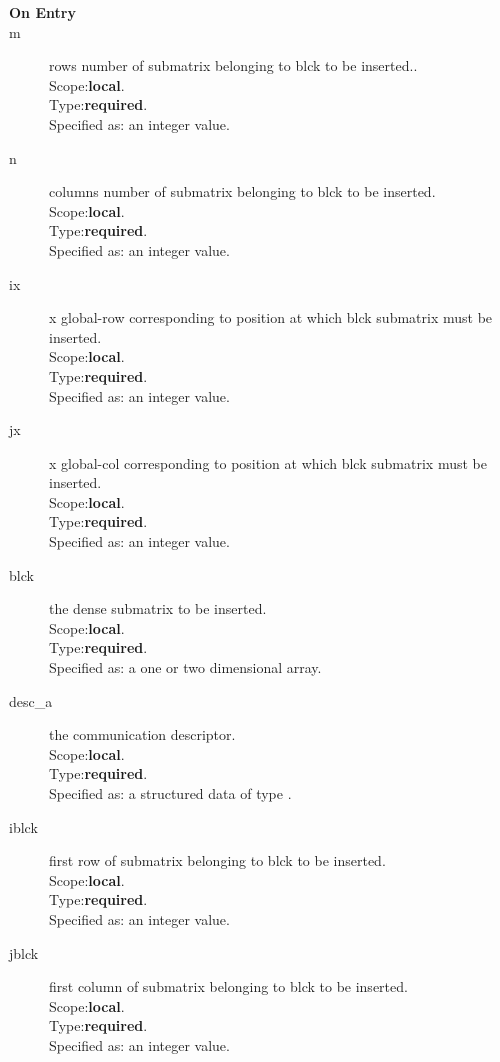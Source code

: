 \begin{description}
\item[\bf On Entry]
\item[m] rows number of submatrix belonging to blck to be inserted..\\
Scope:{\bf local}.\\
Type:{\bf required}.\\
Specified as: an integer value.
\item[n] columns number of submatrix belonging to blck to be inserted.\\
Scope:{\bf local}.\\
Type:{\bf required}.\\
Specified as: an integer value.
\item[ix] x global-row corresponding to position at which blck submatrix must be inserted.\\
Scope:{\bf local}.\\
Type:{\bf required}.\\
Specified as: an integer value.
\item[jx] x global-col corresponding to position at which blck submatrix must be inserted.\\
Scope:{\bf local}.\\
Type:{\bf required}.\\
Specified as: an integer value.
\item[blck] the dense submatrix to be inserted.\\
Scope:{\bf local}.\\
Type:{\bf required}.\\
Specified as: a one or two dimensional array.
\item[desc\_a] the communication descriptor.\\
Scope:{\bf local}.\\
Type:{\bf required}.\\
Specified as: a structured data of type \descdata.
\item[iblck] first row of submatrix belonging to blck to be inserted.\\
Scope:{\bf local}.\\
Type:{\bf required}.\\
Specified as: an integer value.
\item[jblck] first column of submatrix belonging to blck to be inserted.\\
Scope:{\bf local}.\\
Type:{\bf required}.\\
Specified as: an integer value.
\end{description}

